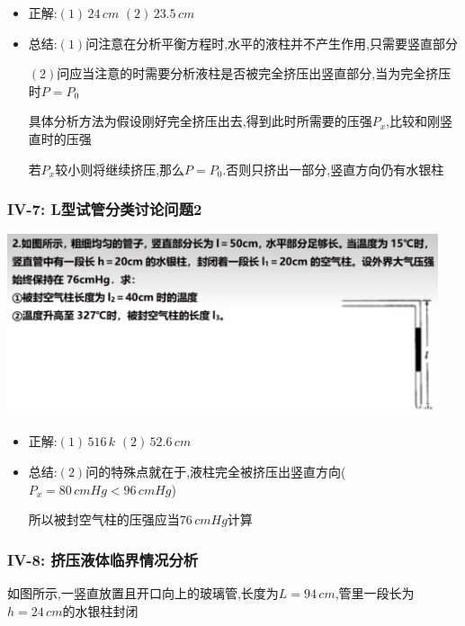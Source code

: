 \documentclass{article}
\begin{document}
\begin{itemize}
    \item 正解:\quad $(1) \, 24 \, cm$  $(2) \, 23.5 \, cm $
    \item 总结:\quad $(1)$问注意在分析平衡方程时,水平的液柱并不产生作用,只需要竖直部分

          \hspace{3.2em}$(2)$问应当注意的时需要分析液柱是否被完全挤压出竖直部分,当为完全挤压时$P = P_{0}$

          \hspace{3.2em}具体分析方法为假设刚好完全挤压出去,得到此时所需要的压强$P_{x}$,比较和刚竖直时的压强

          \hspace{3.2em}若$P_{x}$较小则将继续挤压,那么$P = P_{0}$.否则只挤出一部分,竖直方向仍有水银柱
\end{itemize}

\vspace{2em}

\subsubsection{IV-7: L型试管分类讨论问题2}
\includegraphics[width = 0.95\textwidth,keepaspectratio]{./pictures/2.3-18.png}

\begin{itemize}
    \item 正解:\quad $(1) \, 516 \, k$  $(2) \, 52.6 \, cm $
    \item 总结:\quad $(2)$问的特殊点就在于,液柱完全被挤压出竖直方向($P_{x} = 80 \, cmHg < 96 \, cmHg$)

          \hspace{3.2em}所以被封空气柱的压强应当$76 \, cmHg$计算
\end{itemize}

\vspace{2em}

\subsubsection{IV-8: 挤压液体临界情况分析}
如图所示,一竖直放置且开口向上的玻璃管,长度为$L = 94 \, cm$,管里一段长为$h = 24 \, cm$的水银柱封闭
\end{document}
